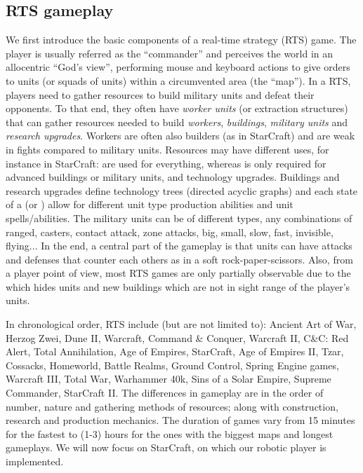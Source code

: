 \subsection{RTS gameplay}
\label{sec:rtsgameplay}
We first introduce the basic components of a real-time strategy (RTS) game. The player is usually referred as the ``commander'' and perceives the world in an allocentric ``God's view'', performing mouse and keyboard actions to give orders to units (or squads of units) within a circumvented area (the ``map''). In a RTS, players need to gather resources to build military units and defeat their opponents. To that end, they often have \textit{worker units} (or extraction structures) that can gather resources needed to build \textit{workers}, \textit{buildings}, \textit{military units} and \textit{research upgrades}. Workers are often also builders (as in StarCraft) and are weak in fights compared to military units. Resources may have different uses, for instance in StarCraft:  are used for everything, whereas  is only required for advanced buildings or military units, and technology upgrades. Buildings and research upgrades define technology trees (directed acyclic graphs) and each state of a 
 (or ) allow for different unit type production abilities and unit spells/abilities. The military units can be of different types, any combinations of ranged, casters, contact attack, zone attacks, big, small, slow, fast, invisible, flying... In the end, a central part of the gameplay is that units can have attacks and defenses that counter each others as in a soft rock-paper-scissors. Also, from a player point of view, most RTS games are only partially observable due to the \textit{} which hides units and new buildings which are not in sight range of the player's units. 


In chronological order, RTS include (but are not limited to): Ancient Art of War, Herzog Zwei, Dune II, Warcraft, Command \& Conquer, Warcraft II, C\&C: Red Alert, Total Annihilation, Age of Empires, StarCraft, Age of Empires II, Tzar, Cossacks, Homeworld, Battle Realms, Ground Control, Spring Engine games, Warcraft III, Total War, Warhammer 40k, Sins of a Solar Empire, Supreme Commander, StarCraft II. The differences in gameplay are in the order of number, nature and gathering methods of resources; along with construction, research and production mechanics. The duration of games vary from 15 minutes for the fastest to (1-3) hours for the ones with the biggest maps and longest gameplays. We will now focus on StarCraft, on which our robotic player is implemented.


